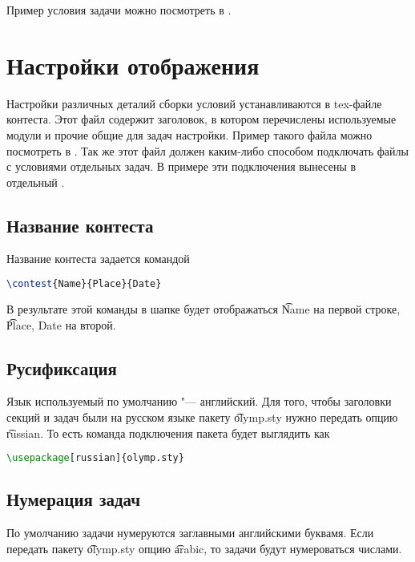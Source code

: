 \documentclass[11pt,a4paper,oneside]{article}
\begin{document}
Пример условия задачи можно посмотреть в .

\section{Настройки отображения}

Настройки различных деталий сборки условий устанавливаются в tex-файле контеста.
Этот файл содержит заголовок, в котором перечислены используемые модули и прочие 
общие для задач настройки. Пример такого файла можно посмотреть в 
.
Так же этот файл должен каким-либо способом подключать файлы с условиями отдельных задач.
В примере эти подключения вынесены в отдельный .

\subsection{Название контеста}

Название контеста задается командой 
\begin{lstlisting}[language=tex]
\contest{Name}{Place}{Date}
\end{lstlisting}

В результате этой команды в шапке будет отображаться \t{Name} на первой строке,
\t{Place, Date} на второй.

\subsection{Русификсация}

Язык используемый по умолчанию "--- английский. Для того, чтобы заголовки секций и задач были на
русском языке пакету \t{olymp.sty} нужно передать опцию \t{russian}. То есть 
команда подключения пакета будет выглядить как
\begin{lstlisting}[language=tex]
\usepackage[russian]{olymp.sty}
\end{lstlisting}

\subsection{Нумерация задач}

По умолчанию задачи нумеруются заглавными английскими буквамя. Если передать пакету 
\t{olymp.sty} опцию \t{arabic}, то задачи будут нумероваться числами.
\end{document}
